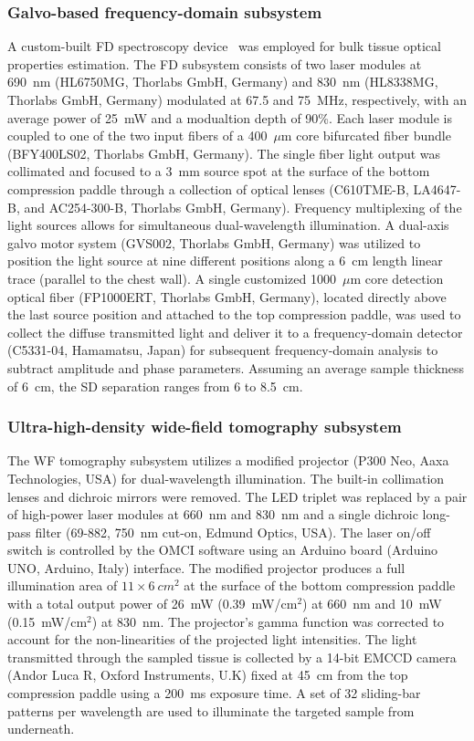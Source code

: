 \subsubsection{Galvo-based frequency-domain subsystem}
\label{sec:RF}
A custom-built \ac{FD} spectroscopy device~\cite{Zimmermann2016} was employed for bulk tissue optical properties estimation. The \ac{FD} subsystem consists of two laser modules at 690~nm (HL6750MG, Thorlabs GmbH, Germany) and 830~nm (HL8338MG, Thorlabs GmbH, Germany) modulated at 67.5 and 75~MHz, respectively, with an average power of 25~mW and a modualtion depth of 90\%. Each laser module is coupled to one of the two input fibers of a 400~$\mu$m core bifurcated fiber bundle (BFY400LS02, Thorlabs GmbH, Germany). The single fiber light output was collimated and focused to a 3~mm source spot at the surface of the bottom compression paddle through a collection of optical lenses (C610TME-B, LA4647-B, and AC254-300-B, Thorlabs GmbH, Germany). Frequency multiplexing of the light sources allows for simultaneous dual-wavelength illumination. A dual-axis galvo motor system (GVS002, Thorlabs GmbH, Germany) was utilized to position the light source at nine different positions along a 6~cm length linear trace (parallel to the chest wall). A single customized 1000~$\mu$m core detection optical fiber (FP1000ERT, Thorlabs GmbH, Germany), located directly above the last source position and attached to the top compression paddle, was used to collect the diffuse transmitted light and deliver it to a frequency-domain detector (C5331-04, Hamamatsu, Japan) for subsequent frequency-domain analysis to subtract amplitude and phase parameters. Assuming an average sample thickness of 6~cm, the \ac{SD} separation ranges from 6 to 8.5~cm.

\subsubsection{Ultra-high-density wide-field tomography subsystem}
\label{sec:WF}
The \ac{WF} tomography subsystem utilizes a modified projector (P300 Neo, Aaxa Technologies, USA) for dual-wavelength illumination. The built-in collimation lenses and dichroic mirrors were removed. The LED triplet was replaced by a pair of high-power laser modules at 660~nm and 830~nm and a single dichroic long-pass filter (69-882, 750~nm cut-on, Edmund Optics, USA). The laser on/off switch is controlled by the \ac{OMCI} software using an Arduino board (Arduino UNO, Arduino, Italy) interface. The modified projector produces a full illumination area of $11\times6~cm^2$ at the surface of the bottom compression paddle with a total output power of 26~mW (0.39~mW/cm$^2$) at 660~nm and 10~mW (0.15~mW/cm$^2$) at 830~nm. The projector's gamma function was corrected to account for the non-linearities of the projected light intensities. The light transmitted through the sampled tissue is collected by a 14-bit \ac{EMCCD} camera (Andor Luca R, Oxford Instruments, U.K) fixed at 45~cm from the top compression paddle using a 200~ms exposure time. A set of 32 sliding-bar patterns per wavelength are used to illuminate the targeted sample from underneath.

